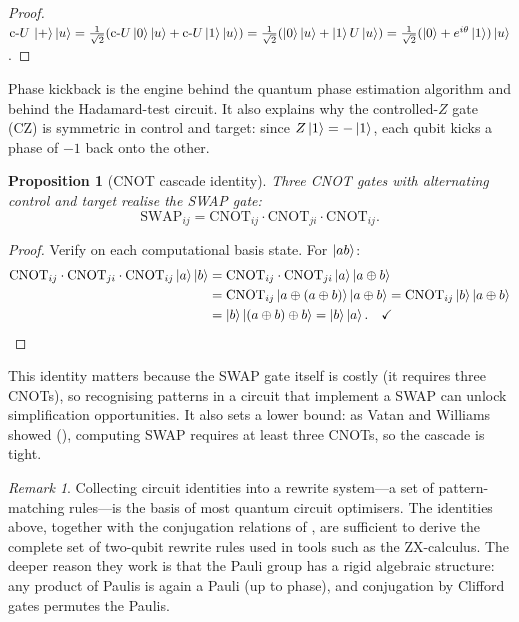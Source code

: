 \documentclass[12pt, a4paper, oneside]{report}
\theoremstyle{plain}
\newtheorem{proposition}[theorem]{Proposition}
\theoremstyle{definition}
\theoremstyle{remark}
\newtheorem{remark}[theorem]{Remark}
\newcommand{\cU}{\mathrm{c}\text{-}U}
\newcommand{\CNOT}{\mathrm{CNOT}}
\begin{document}
\begin{proof}
$\cU\,\ket{+}\ket{u}
= \frac{1}{\sqrt{2}}(\cU\ket{0}\ket{u}+\cU\ket{1}\ket{u})
= \frac{1}{\sqrt{2}}(\ket{0}\ket{u}+\ket{1}U\ket{u})
= \frac{1}{\sqrt{2}}(\ket{0}+e^{i\theta}\ket{1})\ket{u}$.
\end{proof}

Phase kickback is the engine behind the quantum phase estimation algorithm and behind the
Hadamard-test circuit. It also explains why the controlled-$Z$ gate (CZ) is symmetric in
control and target: since $Z\ket{1} = -\ket{1}$, each qubit kicks a phase of $-1$ back onto
the other.

\begin{proposition}[CNOT cascade identity]
\label{prop:cnot-cascade}
Three CNOT gates with alternating control and target realise the SWAP gate:
\[
  \mathrm{SWAP}_{ij}
  = \CNOT_{ij}\cdot\CNOT_{ji}\cdot\CNOT_{ij}.
\]
\end{proposition}

\begin{proof}
Verify on each computational basis state. For $\ket{ab}$:
\begin{align*}
  \CNOT_{ij}\cdot\CNOT_{ji}\cdot\CNOT_{ij}\ket{a}\ket{b}
  &= \CNOT_{ij}\cdot\CNOT_{ji}\ket{a}\ket{a\oplus b} \\
  &= \CNOT_{ij}\ket{a\oplus(a\oplus b)}\ket{a\oplus b}
   = \CNOT_{ij}\ket{b}\ket{a\oplus b} \\
  &= \ket{b}\ket{(a\oplus b)\oplus b}
   = \ket{b}\ket{a}. \quad\checkmark \qedhere
\end{align*}
\end{proof}

This identity matters because the SWAP gate itself is costly (it requires three CNOTs), so
recognising patterns in a circuit that implement a SWAP can unlock simplification
opportunities. It also sets a lower bound: as Vatan and Williams showed
(), computing SWAP requires at least three CNOTs, so the cascade is tight.

\begin{remark}
Collecting circuit identities into a rewrite system---a set of pattern-matching rules---is
the basis of most quantum circuit optimisers. The identities above, together with the
conjugation relations of , are sufficient to derive the
complete set of two-qubit rewrite rules used in tools such as the ZX-calculus. The deeper
reason they work is that the Pauli group has a rigid algebraic structure: any product of
Paulis is again a Pauli (up to phase), and conjugation by Clifford gates permutes the Paulis.
\end{remark}
\end{document}

